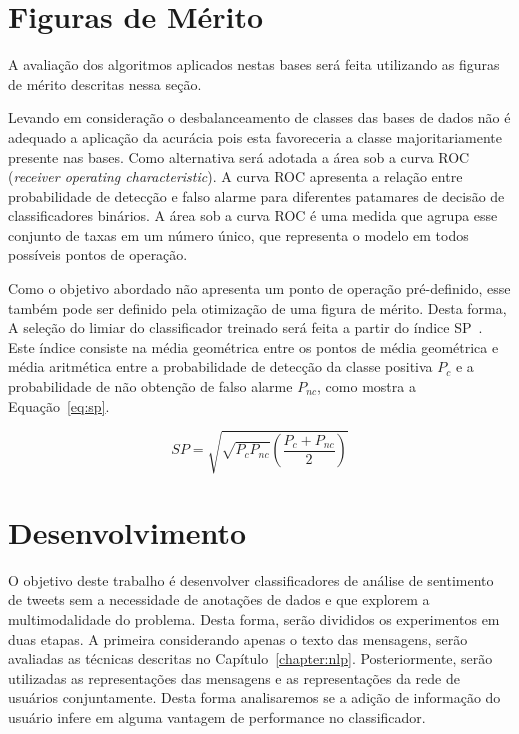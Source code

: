 \section{Figuras de Mérito}

A avaliação dos algoritmos aplicados nestas bases será feita utilizando as figuras
de mérito descritas nessa seção.

Levando em consideração o desbalanceamento de classes das bases de dados não é
adequado a aplicação da acurácia pois esta favoreceria a classe majoritariamente
presente nas bases.
Como alternativa será adotada a área sob a curva ROC (\textit{receiver operating
characteristic}).
A curva ROC apresenta a relação entre probabilidade de detecção e falso alarme
para diferentes patamares de decisão de classificadores binários.
A área sob a curva ROC é uma medida que agrupa esse conjunto de taxas em um
número único, que representa o modelo em todos possíveis pontos de operação.

Como o objetivo abordado não apresenta um ponto de operação pré-definido, esse
também pode ser definido pela otimização de uma figura de mérito.
Desta forma, A seleção do limiar do classificador treinado será feita a partir do
índice SP~\cite{ciodaro12}.
Este índice consiste na média geométrica entre os pontos de média geométrica e
média aritmética entre a probabilidade de detecção da classe positiva $P_c$ e a
probabilidade de não obtenção de falso alarme $P_{nc}$, como mostra a
Equação~\ref{eq:sp}.

\begin{equation} \label{eq:sp}
    SP = \sqrt{\sqrt{P_c P_{nc}} \left(\frac{P_c + P_{nc}}{2}\right)}
\end{equation}

\section{Desenvolvimento}
\label{sec:development}

O objetivo deste trabalho é desenvolver classificadores de análise de sentimento
de tweets sem a necessidade de anotações de dados e que explorem a multimodalidade
do problema.
Desta forma, serão divididos os experimentos em duas etapas.
A primeira considerando apenas o texto das mensagens, serão avaliadas as técnicas
descritas no Capítulo~\ref{chapter:nlp}.
Posteriormente, serão utilizadas as representações das mensagens e as
representações da rede de usuários conjuntamente.
Desta forma analisaremos se a adição de informação do usuário infere em alguma
vantagem de performance no classificador.

